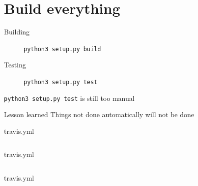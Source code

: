 \documentclass[pdf]{beamer}
\begin{document}
\section{Build everything}

\begin{frame}[fragile]
    \begin{description}
        \item [Building] \verb|python3 setup.py build|
        \item [Testing]  \verb|python3 setup.py test|
    \end{description}
\end{frame}

\begin{frame}[fragile]
    \verb|python3 setup.py test| is still too manual
\end{frame}

\begin{frame}
    \begin{block}{Lesson learned}
        Things not done automatically will not be done
    \end{block}

\end{frame}

\begin{frame}[fragile]{travis.yml}
    \inputminted[lastline=12]{yaml}{travis.yml}
\end{frame}

\begin{frame}[fragile]{travis.yml}
    \inputminted[firstline=16,lastline=25]{yaml}{travis.yml}
\end{frame}

\begin{frame}[fragile]{travis.yml}
    \inputminted[firstline=27]{yaml}{travis.yml}
\end{frame}
\end{document}
